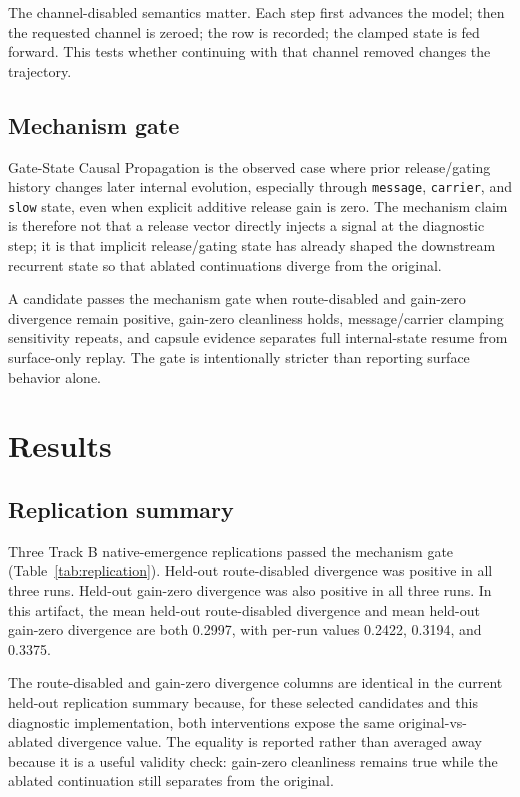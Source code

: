 \documentclass[11pt]{article}
\begin{document}
The channel-disabled semantics matter. Each step first advances the model;
then the requested channel is zeroed; the row is recorded; the clamped state is
fed forward. This tests whether continuing with that channel removed changes
the trajectory.

\subsection{Mechanism gate}

Gate-State Causal Propagation is the observed case where prior release/gating
history changes later internal evolution, especially through \texttt{message},
\texttt{carrier}, and \texttt{slow} state, even when explicit additive release
gain is zero. The mechanism claim is therefore not that a release vector
directly injects a signal at the diagnostic step; it is that implicit
release/gating state has already shaped the downstream recurrent state so that
ablated continuations diverge from the original.

A candidate passes the mechanism gate when route-disabled and gain-zero
divergence remain positive, gain-zero cleanliness holds, message/carrier
clamping sensitivity repeats, and capsule evidence separates full
internal-state resume from surface-only replay. The gate is intentionally
stricter than reporting surface behavior alone.

\section{Results}

\subsection{Replication summary}

Three Track B native-emergence replications passed the mechanism gate
(Table~\ref{tab:replication}). Held-out route-disabled divergence was positive
in all three runs. Held-out gain-zero divergence was also positive in all three
runs. In this artifact, the mean held-out route-disabled divergence and
mean held-out gain-zero divergence are both 0.2997, with per-run values
0.2422, 0.3194, and 0.3375.

The route-disabled and gain-zero divergence columns are identical in the
current held-out replication summary because, for these selected candidates
and this diagnostic implementation, both interventions expose the same
original-vs-ablated divergence value. The equality is reported rather than
averaged away because it is a useful validity check: gain-zero cleanliness
remains true while the ablated continuation still separates from the original.
\end{document}
